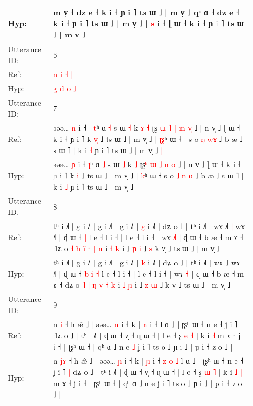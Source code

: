 \documentclass[10pt]{article}
\DeclareRobustCommand{\hl}[1]{{\textcolor{red}{#1}}}
\begin{document}
\begin{longtable}{ll}
 \\
Hyp: & m v̩ ˧ dz e ˧ k i ˧ ɲ i ˥ ts ɯ ˩ | m v̩ ˩\hl{}\hl{} qʰ ɑ ˧ dz e ˧ k i ˧ ɲ i ˥ ts ɯ ˩ | m v̩ ˩ | \hl{s} i ˧ ɭ ɯ ˧ k i ˧ ɲ i ˥ ts ɯ ˩ | m v̩ ˩\hl{}\hl{}
 \\
\midrule
Utterance ID: & 6 \\
Ref: & \hl{n} \hl{i} \hl{˧} \hl{|}
 \\
Hyp: & \hl{g} \hl{d} \hl{o} \hl{˩}
 \\
\midrule
Utterance ID: & 7 \\
Ref: & əəə… \hl{n} i ˧\hl{ }\hl{|} \hl{t}ʰ ɑ \hl{˧} s ɯ \hl{˧} k\hl{ }\hl{ɤ} \hl{˧} ʈʂ\hl{ }\hl{ɯ} \hl{˥} \hl{|} \hl{m} \hl{v}\hl{̩} ˩ | n v̩ ˩ ɭ ɯ ˧ k i ˧ ɲ i ˥ k \hl{v}\hl{̩} ˩ ts ɯ ˩ | m v̩ ˩ | \hl{ʈ}\hl{ʂ}ʰ ɯ ˧\hl{ }\hl{|} s o \hl{ŋ} \hl{}\hl{w}\hl{ɤ} ˩ b æ ˩ s ɯ ˥ | k i \hl{˧} ɲ i ˥ ts ɯ ˩ | m v̩ ˩\hl{ }\hl{|}
 \\
Hyp: & əəə… \hl{ɲ} i ˧\hl{}\hl{} \hl{ʈ}ʰ ɑ \hl{˩} s ɯ \hl{˩} k\hl{}\hl{} \hl{˩} ʈʂ\hl{}\hl{ʰ} \hl{ɯ} \hl{˩} \hl{n} \hl{}\hl{o} ˩ | n v̩ ˩ ɭ ɯ ˧ k i ˧ ɲ i ˥ k \hl{}\hl{i} ˩ ts ɯ ˩ | m v̩ ˩ | \hl{}\hl{k}ʰ ɯ ˧\hl{}\hl{} s o \hl{˩} \hl{n}\hl{ }\hl{ɑ} ˩ b æ ˩ s ɯ ˥ | k i \hl{˩} ɲ i ˥ ts ɯ ˩ | m v̩ ˩\hl{}\hl{}
 \\
\midrule
Utterance ID: & 8 \\
Ref: & tʰ i ˩˥ | g i ˩˥ | g i ˩˥ | g i ˩˥ | \hl{g} i ˩˥ | dʑ o ˩ | tʰ i ˩˥ | wɤ ˩\hl{˥}\hl{ }\hl{|} wɤ ˩˥ | ɖ ɯ ˧\hl{}\hl{}\hl{}\hl{} \hl{|} l e ˧ l i ˧ | l e ˧ l i ˧ | wɤ \hl{˩}\hl{˥} | ɖ ɯ ˧ b æ ˧ m ɤ ˧ dʑ o \hl{˧} \hl{h} \hl{i}\hl{̃}\hl{ }\hl{˧} \hl{|} \hl{n} i \hl{˧} \hl{k} i ˩ \hl{ɲ} \hl{i} ˩\hl{ }\hl{s} k v̩ ˩ ts ɯ ˩ | m v̩ ˩
 \\
Hyp: & tʰ i ˩˥ | g i ˩˥ | g i ˩˥ | g i ˩˥ | \hl{k} i ˩˥ | dʑ o ˩ | tʰ i ˩˥ | wɤ ˩\hl{}\hl{}\hl{} wɤ ˩˥ | ɖ ɯ ˧\hl{ }\hl{b}\hl{ }\hl{i} \hl{˧} l e ˧ l i ˧ | l e ˧ l i ˧ | wɤ \hl{}\hl{˧} | ɖ ɯ ˧ b æ ˧ m ɤ ˧ dʑ o \hl{˥} \hl{|} \hl{ŋ}\hl{ }\hl{v}\hl{̩} \hl{˧} \hl{k} i \hl{˩} \hl{ɲ} i ˩ \hl{z} \hl{ɯ} ˩\hl{}\hl{} k v̩ ˩ ts ɯ ˩ | m v̩ ˩
 \\
\midrule
Utterance ID: & 9 \\
Ref: & n \hl{}\hl{i} ˧ h æ̃ ˩ | əəə… \hl{n} i ˧ k | \hl{n} i ˧\hl{}\hl{}\hl{}\hl{}\hl{}\hl{} l ɑ ˩ | ʈʂʰ ɯ ˧ n e ˧ ʝ i ˥\hl{}\hl{} dʑ o ˩ | tʰ i ˩˥ | ɖ ɯ ˧ v̩ ˧ ɳ ɯ ˧ | l e ˧ ʂ \hl{e} \hl{˧} | k i\hl{}\hl{} \hl{˧} m ɤ ˧ ʝ i ˧ | ʈʂʰ ɯ ˧ | qʰ ɑ ˩ n e\hl{ }\hl{˩} ʝ i ˥ ts o ˩ ɲ i ˩ | p i ˧ z o ˩ |
 \\
Hyp: & n \hl{j}\hl{ɤ} ˧ h æ̃ ˩ | əəə… \hl{ɲ} i ˧ k | \hl{ɲ} i ˧\hl{ }\hl{z}\hl{ }\hl{o}\hl{ }\hl{˩} l ɑ ˩ | ʈʂʰ ɯ ˧ n e ˧ ʝ i ˥\hl{ }\hl{|} dʑ o ˩ | tʰ i ˩˥ | ɖ ɯ ˧ v̩ ˧ ɳ ɯ ˧ | l e ˧ ʂ \hl{ɯ} \hl{˥} | k i\hl{ }\hl{˩} \hl{|} m ɤ ˧ ʝ i ˧ | ʈʂʰ ɯ ˧ | qʰ ɑ ˩ n e\hl{}\hl{} ʝ i ˥ ts o ˩ ɲ i ˩ | p i ˧ z o ˩ |

\end{longtable}
\end{document}
